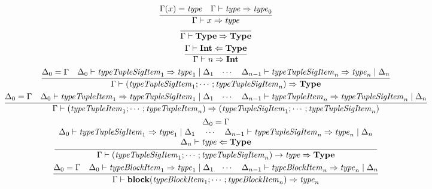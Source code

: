 \begin{gather*}
  \infer{\Gamma \vdash x \Rightarrow \mathit{type}}{
    \Gamma(x) = \mathit{type}
    &
    \Gamma \vdash \mathit{type} \Rightarrow \mathit{type}_0
  }
  \\
  \infer{\Gamma \vdash \mathbf{Type} \Rightarrow \mathbf{Type}}{}
  \\
  \infer{\Gamma \vdash n \Rightarrow \mathbf{Int}}{
    \Gamma \vdash \mathbf{Int} \Leftarrow \mathbf{Type}
  }
  \\
  \infer{\Gamma \vdash (\mathit{typeTupleSigItem}_1; \cdots; \mathit{typeTupleSigItem}_n) \Rightarrow \mathbf{Type}}{
    \Delta_0 = \Gamma
    &
    \Delta_0 \vdash \mathit{typeTupleSigItem}_1 \Rightarrow \mathit{type}_1 \mid \Delta_1
    &
    \cdots
    &
    \Delta_{n - 1} \vdash \mathit{typeTupleSigItem}_n \Rightarrow \mathit{type}_n \mid \Delta_n
  }
  \\
  \infer{\Gamma \vdash (\mathit{typeTupleItem}_1; \cdots; \mathit{typeTupleItem}_n) \Rightarrow (\mathit{typeTupleSigItem}_1; \cdots; \mathit{typeTupleSigItem}_n)}{
    \Delta_0 = \Gamma
    &
    \Delta_0 \vdash \mathit{typeTupleItem}_1 \Rightarrow \mathit{typeTupleSigItem}_1 \mid \Delta_1
    &
    \cdots
    &
    \Delta_{n - 1} \vdash \mathit{typeTupleItem}_n \Rightarrow \mathit{typeTupleSigItem}_n \mid \Delta_n
  }
  \\
  \infer{\Gamma \vdash (\mathit{typeTupleSigItem}_1; \cdots; \mathit{typeTupleSigItem}_n) \rightarrow \mathit{type} \Rightarrow \mathbf{Type}}{
    \begin{array}{c}
      \Delta_0 = \Gamma
      \\
      \Delta_0 \vdash \mathit{typeTupleSigItem}_1 \Rightarrow \mathit{type}_1 \mid \Delta_1
      \hspace{1em}
      \cdots
      \hspace{1em}
      \Delta_{n - 1} \vdash \mathit{typeTupleSigItem}_n \Rightarrow \mathit{type}_n \mid \Delta_n
      \\
      \Delta_n \vdash \mathit{type} \Leftarrow \mathbf{Type}
    \end{array}
  }
  \\
  \infer{\Gamma \vdash \mathbf{block}(\mathit{typeBlockItem}_1; \cdots; \mathit{typeBlockItem}_n) \Rightarrow \mathit{type}_n}{
    \Delta_0 = \Gamma
    &
    \Delta_0 \vdash \mathit{typeBlockItem}_1 \Rightarrow \mathit{type}_1 \mid \Delta_1
    &
    \cdots
    &
    \Delta_{n - 1} \vdash \mathit{typeBlockItem}_n \Rightarrow \mathit{type}_n \mid \Delta_n
  }
  \\

\end{gather*}

